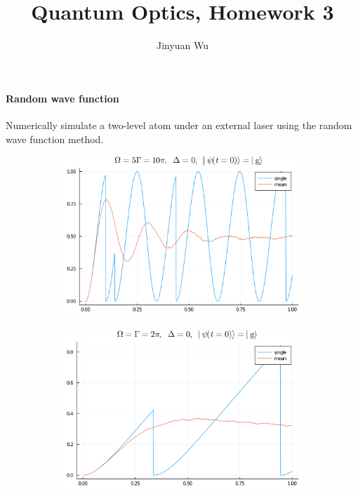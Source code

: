 \documentclass[hyperref, a4paper]{article}
\title{Quantum Optics, Homework 3}
\author{Jinyuan Wu}
\begin{document}
\maketitle

\paragraph{Random wave function} Numerically simulate a two-level atom under an external laser using the random wave
function method.

\begin{figure}
    \centering
    \begin{subfigure}{0.45\textwidth}
        \includegraphics[width=\textwidth]{rwf-1.png}
        \subcaption{}
    \end{subfigure}
    \begin{subfigure}{0.45\textwidth}
        \includegraphics[width=\textwidth]{rwf-2.png}

\end{subfigure}
\end{figure}
\end{document}
